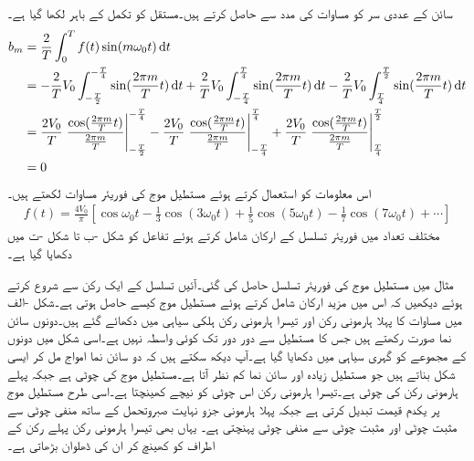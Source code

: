 سائن کے عددی سر  کو مساوات  کی مدد سے حاصل کرتے ہیں۔مستقل  کو تکمل کے باہر لکھا گیا ہے۔
\begin{align*}
b_m&=\frac{2}{T}\int_0^T f(t)\sin(m\omega_0 t) \dif t\\
&=-\frac{2}{T}V_0\int_{-\frac{T}{2}}^{-\frac{T}{4}} \sin (\frac{2\pi m}{T} t) \dif t+\frac{2}{T}V_0\int_{-\frac{T}{4}}^{\frac{T}{4}} \sin (\frac{2\pi m}{T} t) \dif t-\frac{2}{T}V_0\int_{\frac{T}{4}}^{\frac{T}{2}} \sin (\frac{2\pi m}{T} t) \dif t\\
&=\frac{2V_0}{T}\left.\frac{\cos (\frac{2\pi m}{T} t)}{\frac{2\pi m}{T}}\right|_{-\frac{T}{2}}^{-\frac{T}{4}}-\frac{2V_0}{T}\left.\frac{\cos (\frac{2\pi m}{T} t)}{\frac{2\pi m}{T}}\right|_{-\frac{T}{4}}^{\frac{T}{4}}+\frac{2V_0}{T}\left.\frac{\cos (\frac{2\pi m}{T} t)}{\frac{2\pi m}{T}}\right|_{\frac{T}{4}}^{\frac{T}{2}}\\
&=0
\end{align*}
اس معلومات کو استعمال کرتے ہوئے مستطیل موج کی فوریئر مساوات لکھتے ہیں۔
\begin{align}\label{مساوات_فوریئر_مستطیل_موج}
f(t)=\frac{4V_0}{\pi}\left[\cos \omega_0 t-\frac{1}{3}\cos(3\omega_0 t)+\frac{1}{5}\cos(5\omega_0 t)-\frac{1}{7}\cos(7\omega_0 t)+\cdots\right]
\end{align}
مختلف تعداد میں فوریئر تسلسل کے ارکان شامل کرتے ہوئے تفاعل کو شکل -ب تا شکل -ت میں دکھایا گیا ہے۔

مثال  میں مستطیل موج کی فوریئر تسلسل  حاصل کی گئی۔آئیں تسلسل کے ایک رکن سے شروع کرتے ہوئے دیکھیں کہ اس میں مزید ارکان شامل کرتے ہوئے مستطیل موج کیسے حاصل ہوتی ہے۔شکل -الف میں  مساوات  کا پہلا ہارمونی رکن  اور تیسرا ہارمونی رکن  ہلکی سیاہی میں دکھائے گئے ہیں۔دونوں سائن نما صورت رکھتے ہیں جس کا مستطیل سے دور دور تک کوئی واسطہ نہیں ہے۔اسی شکل میں دونوں کے مجموعے کو گہری سیاہی میں دکھایا گیا ہے۔آپ دیکھ سکتے ہیں کہ دو سائن نما امواج مل کر ایسی شکل بناتے ہیں جو مستطیل زیادہ اور سائن نما کم نظر آتا ہے۔مستطیل موج کی چوٹی  ہے جبکہ پہلے ہارمونی رکن کی چوٹی  ہے۔تیسرا ہارمونی رکن اس چوٹی کو نیچے کھینچتا ہے۔اسی طرح مستطیل موج  پر یکدم قیمت تبدیل کرتی ہے جبکہ پہلا ہارمونی جزو نہایت صبروتحمل کے ساتھ منفی چوٹی سے مثبت چوٹی اور مثبت چوٹی سے منفی چوٹی پہنچتی ہے۔ یہاں بھی تیسرا ہارمونی رکن پہلے رکن کے اطراف کو کھینچ کر ان کی ڈھلوان بڑھاتی ہے۔


